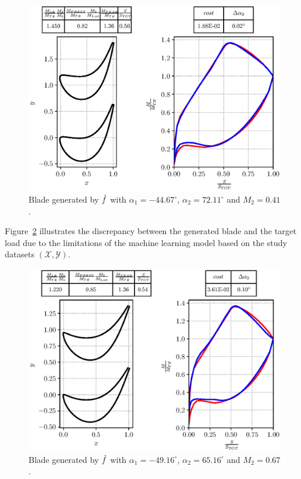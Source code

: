 \begin{figure}[H]
    \centering 
    \includegraphics[scale=\scaleBlade]{./images/blade--4467-7211-41.eps}
    \caption{Blade generated by $\hat{\mathnormal{f}}$ with $\alpha_1 = -44.67^{\circ}$, $\alpha_2 = 72.11^{\circ}$ and $M_2 = 0.41$.}
    \label{fig:bladeML2}
\end{figure}


Figure~\ref{fig:bladeML3} illustrates the discrepancy between the generated blade and the target load due to the limitations of the machine learning model based on the study datasets $(\mathcal{X}, \mathcal{Y})$.

\begin{figure}[H]
    \centering 
    \includegraphics[scale=\scaleBlade]{./images/blade--4916-6516-67.eps}
    \caption{Blade generated by $\hat{\mathnormal{f}}$ with $\alpha_1 = -49.16^{\circ}$, $\alpha_2 = 65.16^{\circ}$ and $M_2 = 0.67$.}
    \label{fig:bladeML3}
\end{figure}

